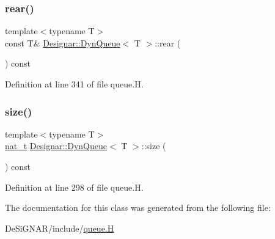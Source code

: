 \subsubsection{\texorpdfstring{rear()}{rear()}\hspace{0.1cm}{\footnotesize\ttfamily [2/2]}}
{\footnotesize\ttfamily template$<$typename T$>$ \\
const T\& \hyperlink{class_designar_1_1_dyn_queue}{Designar\+::\+Dyn\+Queue}$<$ T $>$\+::rear (\begin{DoxyParamCaption}{ }\end{DoxyParamCaption}) const\hspace{0.3cm}{\ttfamily [inline]}}



Definition at line 341 of file queue.\+H.

\mbox{\label{class_designar_1_1_dyn_queue_a3fa0e8fd7d197de1a60caae23b5c305e}} 
\subsubsection{\texorpdfstring{size()}{size()}}
{\footnotesize\ttfamily template$<$typename T$>$ \\
\hyperlink{namespace_designar_aa72662848b9f4815e7bf31a7cf3e33d1}{nat\+\_\+t} \hyperlink{class_designar_1_1_dyn_queue}{Designar\+::\+Dyn\+Queue}$<$ T $>$\+::size (\begin{DoxyParamCaption}{ }\end{DoxyParamCaption}) const\hspace{0.3cm}{\ttfamily [inline]}}



Definition at line 298 of file queue.\+H.



The documentation for this class was generated from the following file\+:\begin{DoxyCompactItemize}
\item 
De\+Si\+G\+N\+A\+R/include/\hyperlink{queue_8_h}{queue.\+H}\end{DoxyCompactItemize}

